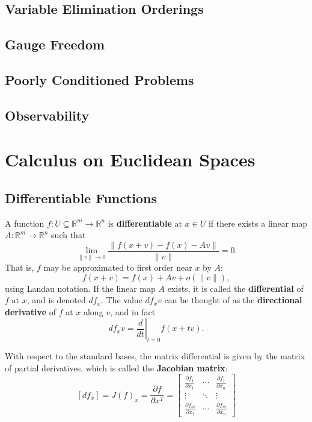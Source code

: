 \documentclass[reqno]{amsart}
\numberwithin{equation}{section}
\begin{document}
\subsection{Variable Elimination Orderings}
\subsection{Gauge Freedom}
\subsection{Poorly Conditioned Problems}
\subsection{Observability}

\appendix

\section{Calculus on Euclidean Spaces}

\subsection{Differentiable Functions}

A function $f : U \subseteq \mathbb R^m \to \mathbb R^n$ is \textbf{differentiable} at $x \in U$
if there exists a linear map $A : \mathbb R^m \to \mathbb R^n$ such that
$$
    \lim_{\|v\| \to 0} \frac{\|f(x + v) - f(x) - A v\|}{\|v\|} = 0.
$$
That is, $f$ may be approximated to first order near $x$ by $A$:
$$
    f(x+v) = f(x) + A v + o(\|v\|),
$$
using Landau notation. If the linear map $A$ exists, it is called the \textbf{differential}
of $f$ at $x$, and is denoted $df_x$. The value $df_x v$ can be thought of as the
\textbf{directional derivative} of $f$ at $x$ along $v$, and in fact
$$
    df_x v = \left.\frac{d}{dt}\right|_{t=0}f(x + tv).
$$

With respect to the standard bases, the matrix differential is given
by the matrix of partial derivatives, which is called the \textbf{Jacobian matrix}:
$$
    [df_x] = J(f)_x =
        \frac{\partial f }{\partial x^T} =
        \begin{bmatrix} \frac{\partial f_1}{\partial x_1} & \cdots & \frac{\partial f_1}{\partial x_n} \\
        \vdots & \ddots & \vdots \\ 
        \frac{\partial f_m}{\partial x_1} & \cdots & \frac{\partial f_m}{\partial x_n}
        \end{bmatrix}
$$
\end{document}
